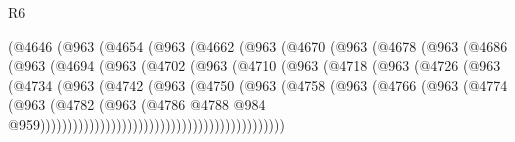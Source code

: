 \begin{lexlean}{R6}
\begin{coremodule}
                    (@4646
                      (@963
                        (@4654
                          (@963
                            (@4662
                              (@963
                                (@4670
                                  (@963
                                    (@4678
                                      (@963
                                        (@4686
                                          (@963
                                            (@4694
                                              (@963
                                                (@4702
                                                  (@963
                                                    (@4710
                                                      (@963
                                                        (@4718
                                                          (@963
                                                            (@4726
                                                              (@963
                                                                (@4734
                                                                  (@963
                                                                    (@4742
                                                                      (@963
                                                                        (@4750
                                                                          (@963
                                                                            (@4758
                                                                              (@963
                                                                                (@4766
                                                                                  (@963
                                                                                    (@4774
                                                                                      (@963
                                                                                        (@4782
                                                                                          (@963
                                                                                            (@4786
                                                                                              @4788
                                                                                              @984
                                                                                              @959)))))))))))))))))))))))))))))))))))))))))))))

\end{coremodule}
\end{lexlean}
